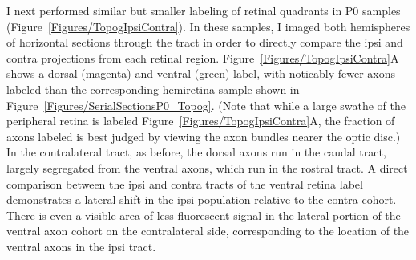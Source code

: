 I next performed similar but smaller labeling of retinal quadrants in P0 samples (Figure~\ref{Figures/TopogIpsiContra}).
In these samples, I imaged both hemispheres of horizontal sections through the tract in order to directly compare the ipsi and contra projections from each retinal region.
Figure~\ref{Figures/TopogIpsiContra}A shows a dorsal (magenta) and ventral (green) label, with noticably fewer axons labeled than the corresponding hemiretina sample shown in Figure~\ref{Figures/SerialSectionsP0_Topog}.
(Note that while a large swathe of the peripheral retina is labeled Figure~\ref{Figures/TopogIpsiContra}A, the fraction of axons labeled is best judged by viewing the axon bundles nearer the optic disc.)
In the contralateral tract, as before, the dorsal axons run in the caudal tract, largely segregated from the ventral axons, which run in the rostral tract.
A direct comparison between the ipsi and contra tracts of the ventral retina label demonstrates a lateral shift in the ipsi population relative to the contra cohort.
There is even a visible area of less fluorescent signal in the lateral portion of the ventral axon cohort on the contralateral side, corresponding to the location of the ventral axons in the ipsi tract.
